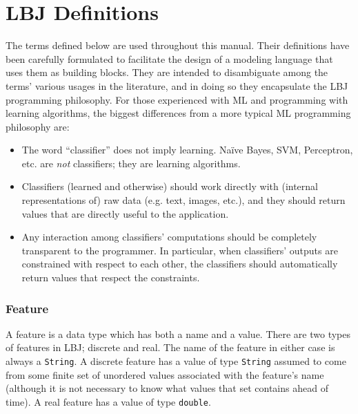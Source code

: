 
\chapter{LBJ Definitions}

The terms defined below are used throughout this manual.  Their definitions
have been carefully formulated to facilitate the design of a modeling language
that uses them as building blocks.  They are intended to disambiguate among
the terms' various usages in the literature, and in doing so they encapsulate
the LBJ programming philosophy.  For those experienced with ML and programming
with learning algorithms, the biggest differences from a more typical ML
programming philosophy are:

\begin{itemize}
\item
The word ``classifier'' does not imply learning.  Na\"ive Bayes, SVM,
Perceptron, etc. are \emph{not} classifiers; they are learning algorithms.

\item
Classifiers (learned and otherwise) should work directly with (internal
representations of) raw data (e.g. text, images, etc.), and they should return
values that are directly useful to the application.

\item
Any interaction among classifiers' computations should be completely
transparent to the programmer.  In particular, when classifiers' outputs are
constrained with respect to each other, the classifiers should automatically
return values that respect the constraints.
\end{itemize}

\subsection*{Feature}
A feature is a data type which has both a name and a value.  There are two
types of features in LBJ; discrete and real.  The name of the feature in
either case is always a {\tt String}.  A discrete feature has a value of type
{\tt String} assumed to come from some finite set of unordered values
associated with the feature's name (although it is not necessary to know what
values that set contains ahead of time).  A real feature has a value of type
{\tt double}.

